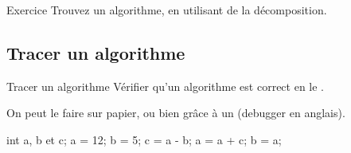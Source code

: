 \begin{hideedit}
\begin{frame}{Exercice}
  Trouvez un algorithme, en utilisant de la décomposition.
\end{frame}

\subsection{Tracer un algorithme}
\begin{frame}[fragile]{Tracer un algorithme}
  Vérifier qu'un algorithme est correct en le .

  On peut le faire sur papier, ou bien grâce à un 
  (debugger en anglais).
  \begin{java}
int a, b et c;
a = 12;
b = 5;
c = a - b;
a = a + c;
b = a;
  \end{java}
\end{frame}


\end{hideedit}
